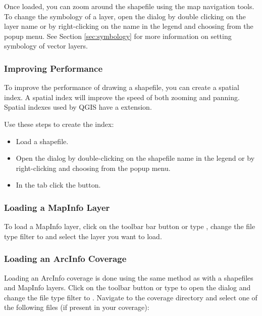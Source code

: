 Once loaded, you can zoom around the shapefile using the map navigation tools.
To change the symbology of a layer, open the  dialog by double
clicking on the layer name or by right-clicking on the name in the legend and
choosing  from the popup menu. See
Section \ref{sec:symbology} for more information on setting symbology of
vector layers.
  
\subsubsection{Improving Performance}

To improve the performance of drawing a shapefile, you can create a spatial
index. A  spatial index will improve the 
speed of both zooming and panning. Spatial indexes used by QGIS have a 
 extension.

Use these steps to create the index:

\begin{itemize}
\item Load a shapefile.
\item Open the  dialog by double-clicking on the
shapefile name in the legend or by right-clicking and choosing
 from the popup menu.
\item In the tab  click the  button.
\end{itemize}

\subsubsection{Loading a MapInfo Layer}

To load a MapInfo layer, click on the 
toolbar bar button or type , change the file type filter to
 and select the layer you want to load.

\subsubsection{Loading an ArcInfo Coverage}

Loading an ArcInfo coverage is done using the same method as with a
shapefiles and MapInfo layers. Click on the 
toolbar button or type  to open the 
dialog and change the file type filter to
. Navigate to the coverage directory and select one
of the following files (if present in your coverage):

